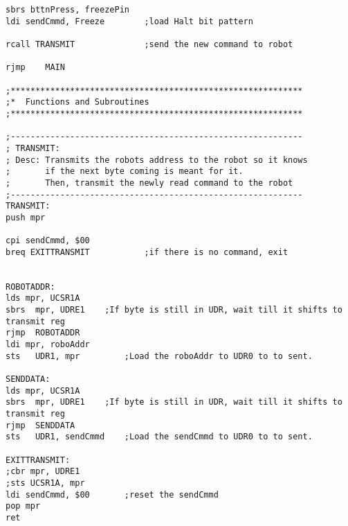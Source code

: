 \documentclass[12pt,letterpaper]{article}
\begin{document}
\begin{verbatim}
sbrs bttnPress, freezePin
ldi sendCmmd, Freeze		;load Halt bit pattern

rcall TRANSMIT 				;send the new command to robot

rjmp	MAIN

;***********************************************************
;*	Functions and Subroutines
;***********************************************************

;-----------------------------------------------------------
; TRANSMIT: 
; Desc:	Transmits the robots address to the robot so it knows
;		if the next byte coming is meant for it.
;		Then, transmit the newly read command to the robot
;-----------------------------------------------------------
TRANSMIT:
push mpr

cpi sendCmmd, $00
breq EXITTRANSMIT 			;if there is no command, exit


ROBOTADDR:
lds mpr, UCSR1A
sbrs  mpr, UDRE1 	;If byte is still in UDR, wait till it shifts to transmit reg 
rjmp  ROBOTADDR
ldi mpr, roboAddr
sts   UDR1, mpr    		;Load the roboAddr to UDR0 to to sent.

SENDDATA:
lds mpr, UCSR1A
sbrs  mpr, UDRE1 	;If byte is still in UDR, wait till it shifts to transmit reg 
rjmp  SENDDATA
sts   UDR1, sendCmmd 	;Load the sendCmmd to UDR0 to to sent.	

EXITTRANSMIT:
;cbr mpr, UDRE1
;sts UCSR1A, mpr
ldi sendCmmd, $00 		;reset the sendCmmd 
pop mpr
ret

	\end{verbatim}
	
\end{document}
